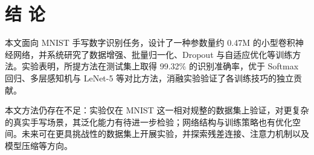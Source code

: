 \section*{结 \quad 论}


本文面向 MNIST 手写数字识别任务，设计了一种参数量约 0.47M 的小型卷积神经网络，并系统研究了数据增强、批量归一化、Dropout 与自适应优化等训练方法。实验表明，所提方法在测试集上取得 99.32\% 的识别准确率，优于 Softmax 回归、多层感知机与 LeNet-5 等对比方法，消融实验验证了各训练技巧的独立贡献。


本文方法仍存在不足：实验仅在 MNIST 这一相对规整的数据集上验证，对更复杂的真实手写场景，其泛化能力有待进一步检验；网络结构与训练策略也有优化空间。未来可在更具挑战性的数据集上开展实验，并探索残差连接、注意力机制以及模型压缩等方向。
